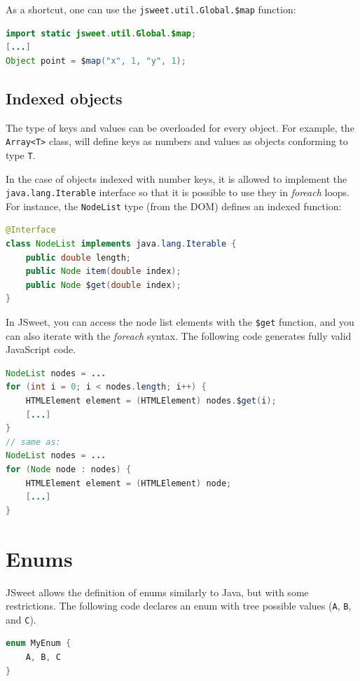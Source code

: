 \documentclass[a4paper]{report}
\begin{document}
As a shortcut, one can use the \texttt{jsweet.util.Global.\$map} function:

\begin{lstlisting}[language=Java]
import static jsweet.util.Global.$map;
[...]
Object point = $map("x", 1, "y", 1);
\end{lstlisting}

\subsection{Indexed objects}

The type of keys and values can be overloaded for every object. For example, the \texttt{Array<T>} class, will define keys as numbers and values as objects conforming to type \texttt{T}.

In the case of objects indexed with number keys, it is allowed to implement the \texttt{java.lang.Iterable} interface so that it is possible to use they in \emph{foreach} loops. For instance, the \texttt{NodeList} type (from the DOM) defines an indexed function:

\begin{lstlisting}[language=Java]
@Interface
class NodeList implements java.lang.Iterable {
    public double length;
    public Node item(double index);
    public Node $get(double index);
}
\end{lstlisting}

In JSweet, you can access the node list elements with the \texttt{\$get} function, and you can also iterate with the \emph{foreach} syntax. The following code generates fully valid JavaScript code.

\begin{lstlisting}[language=Java]
NodeList nodes = ...
for (int i = 0; i < nodes.length; i++) {
	HTMLElement element = (HTMLElement) nodes.$get(i);
	[...]
}
// same as:
NodeList nodes = ...
for (Node node : nodes) {
	HTMLElement element = (HTMLElement) node;
	[...]
}
\end{lstlisting}

\section{Enums} 

JSweet allows the definition of enums similarly to Java, but with some restrictions. The following code declares an enum with tree possible values (\texttt{A}, \texttt{B}, and \texttt{C}).

\begin{lstlisting}[language=Java]
enum MyEnum {
	A, B, C
}
\end{lstlisting}
\end{document}
